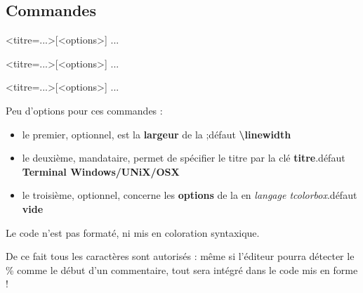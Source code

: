 \documentclass{article}
\newcommand\ctex[1]{\tcbox[vignettelatex]{#1}}
\newcommand\Cle[1]{{\bfseries\sffamily\textlangle #1\textrangle}}
\begin{document}
\subsection{Commandes}

\begin{codetex}
\begin{PLtermwin}[<largeur>]{<titre=...>}[<options>]
...
\end{PLtermwin}

\begin{PLtermunix}[<largeur>]{<titre=...>}[<options>]
...
\end{PLtermunix}

\begin{PLtermosx}[<largeur>]{<titre=...>}[<options>]
...
\end{PLtermosx}
\end{codetex}

\begin{codecles}
Peu d'options pour ces commandes :

\begin{itemize}
	\item le premier, optionnel, est la \Cle{largeur} de la \ctex{tcbox} ;\hfill{}défaut \Cle{\textbackslash linewidth}
	\item le deuxième, mandataire, permet de spécifier le titre par la clé \Cle{titre}.\hfill{}défaut \Cle{Terminal Windows/UNiX/OSX}
	\item le troisième, optionnel, concerne les \Cle{options} de la \ctex{tcbox} en \textit{langage tcolorbox}.\hfill{}défaut \Cle{vide}
\end{itemize}
\end{codecles}

\begin{codeinfo}
Le \textsf{code} n'est pas formaté, ni mis en coloration syntaxique.

De ce fait tous les caractères sont autorisés : même si l'éditeur pourra détecter le \% comme le début d'un commentaire, tout sera intégré dans le code mis en forme !
\end{codeinfo}

\begin{codetex}
\end{codetex}
\end{document}
